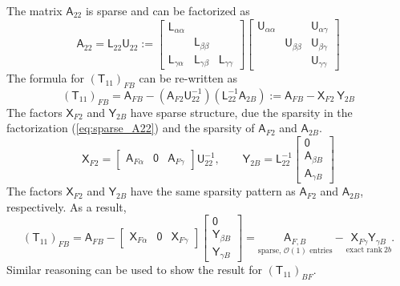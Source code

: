 \documentclass[11pt]{amsart}
\newcommand{\mtx}[1]{\bm{\mathsf{#1}}}
\begin{document}
The matrix $\mtx A_{22}$ is sparse and can be factorized as
\begin{equation}
\mtx A_{22} = \mtx L_{22} \mtx U_{22} := 
\begin{bmatrix} \mtx L_{\alpha \alpha}\\
& \mtx L_{\beta \beta}\\
\mtx L_{\gamma \alpha} & \mtx L_{\gamma \beta} & \mtx L_{\gamma \gamma}\end{bmatrix} 
\begin{bmatrix} \mtx U_{\alpha \alpha} & & \mtx U_{\alpha \gamma}\\
& \mtx U_{\beta \beta} & \mtx U_{\beta \gamma}\\
 &  & \mtx U_{\gamma \gamma}\end{bmatrix} 
 \label{eq:sparse_A22}
\end{equation}
The formula for ${\left( \mtx T_{11} \right)}_{FB}$ can be re-written as
\begin{equation}
{\left( \mtx T_{11} \right)}_{FB} = \mtx A_{FB}
 - {\left( \mtx A_{F2} \mtx U_{22}^{-1}\right)}
 {\left( \mtx L_{22}^{-1} \mtx A_{2B}\right)}
:= \mtx A_{FB} - {\mtx X_{F2}}\ {\mtx Y_{2B}}
\end{equation}
The factors $\mtx X_{F2}$ and $\mtx Y_{2B}$ have sparse
structure, due the sparsity in the factorization (\ref{eq:sparse_A22})
and the sparsity of $\mtx A_{F2}$ and $\mtx A_{2B}$.
\begin{equation}
\mtx X_{F2} = \begin{bmatrix} \mtx A_{F\alpha}& \mtx 0 & \mtx A_{F\gamma}\end{bmatrix} \mtx U_{22}^{-1},\qquad \mtx Y_{2B} 
= \mtx L_{22}^{-1} \begin{bmatrix} \mtx 0\\ \mtx A_{\beta B}\\ \mtx A_{\gamma B}\end{bmatrix}
\end{equation}
The factors $\mtx X_{F2}$ and $\mtx Y_{2B}$ have the same sparsity pattern as $\mtx A_{F2}$ and $\mtx A_{2B}$, respectively.
As a result,
\begin{equation}
{\left( \mtx T_{11} \right)}_{FB} = \mtx A_{FB} - \begin{bmatrix} \mtx X_{F\alpha}& \mtx 0 & \mtx X_{F\gamma}\end{bmatrix} \begin{bmatrix} \mtx 0\\ \mtx Y_{\beta B}\\ \mtx Y_{\gamma B}\end{bmatrix} = \underset{\text{sparse, $\mathcal O(1)$ entries}}{\mtx A_{F,B}} - 
\underset{\text{exact rank}\ 2b}{\mtx X_{F\gamma} \mtx Y_{\gamma B}}.
\end{equation}
Similar reasoning can be used to show the result for $\left( \mtx T_{11} \right)_{BF}$.



\end{document}
